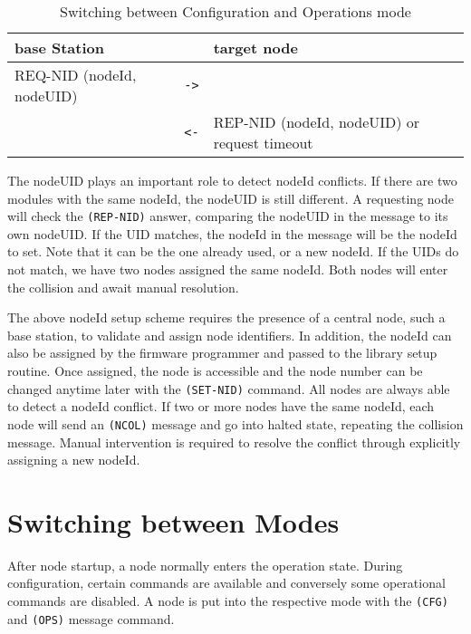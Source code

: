 \begin{table}[ht!]
    \begin{center}
        \caption{Switching between Configuration and Operations mode}
        \begin{tabular}{|p{}| c | p{}|}
            \toprule
            \textbf{base Station} & & \textbf{target node} \\
            \midrule
            REQ-NID (nodeId, nodeUID)  & \texttt{->} & \\
            & \texttt{<-} & REP-NID (nodeId, nodeUID) or request timeout \\
            \bottomrule
        \end{tabular}
    \end{center}
\end{table}

The nodeUID plays an important role to detect nodeId conflicts. If there are two modules with the same nodeId, the nodeUID is still different. A requesting node will check the \texttt{(REP-NID)} answer, comparing the nodeUID in the message to its own nodeUID. If the UID matches, the nodeId in the message will be the nodeId to set. Note that it can be the one already used, or a new nodeId. If the UIDs do not match, we have two nodes assigned the same nodeId. Both nodes will enter the collision and await manual resolution.

The above nodeId setup scheme requires the presence of a central node, such a base station, to validate and assign node identifiers. In addition, the nodeId can also be assigned by the firmware programmer and passed to the library setup routine. Once assigned, the node is accessible and the node number can be changed anytime later with the \texttt{(SET-NID)} command. All nodes are always able to detect a nodeId conflict. If two or more nodes have the same nodeId, each node will send an \texttt{(NCOL)} message and go into halted state, repeating the collision message. Manual intervention is required to resolve the conflict through explicitly assigning a new nodeId.

\section{Switching between Modes}

After node startup, a node normally enters the operation state. During configuration, certain commands are available and conversely some operational commands are disabled. A node is put into the respective mode with the \texttt{(CFG)} and \texttt{(OPS)} message command.

